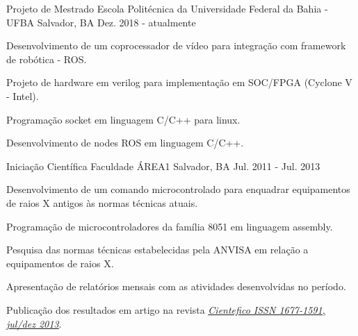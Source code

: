 \begin{cventries}
  \cventry
    {Projeto de Mestrado} %
    {Escola Politécnica da Universidade Federal da Bahia - UFBA} %
    {Salvador, BA} %
    {Dez. 2018 - atualmente} %
    {
      \begin{cvitems} %
        \item {Desenvolvimento de um coprocessador de vídeo para integração com framework de robótica - ROS.}
        \item {Projeto de hardware em verilog para implementação em SOC/FPGA (Cyclone V - Intel).}
        \item {Programação socket em linguagem C/C++ para linux.}
        \item {Desenvolvimento de nodes ROS em linguagem C/C++.}
      \end{cvitems}
    }

  \cventry
    {Iniciação Científica} %
    {Faculdade ÁREA1} %
    {Salvador, BA} %
    {Jul. 2011 - Jul. 2013} %
    {
      \begin{cvitems} %
        \item {Desenvolvimento de um comando microcontrolado para enquadrar equipamentos de raios X antigos às normas técnicas atuais.}
        \item {Programação de microcontroladores da família 8051 em linguagem assembly.}
        \item {Pesquisa das normas técnicas estabelecidas pela ANVISA em relação a equipamentos de raios X.}
        \item {Apresentação de relatórios mensais com as atividades desenvolvidas no período.}
        \item {Publicação dos resultados em artigo na revista \underline{\href{https://cientefico.emnuvens.com.br/cientefico/article/view/58}{\emph{Cientefico ISSN 1677-1591, jul/dez 2013}}}.}
      \end{cvitems}
    }
    

\end{cventries}

